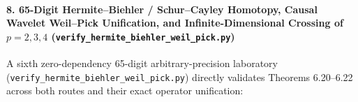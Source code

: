 \documentclass[
  11pt,
]{article}
\begin{document}
\paragraph{\texorpdfstring{8. 65-Digit Hermite--Biehler / Schur--Cayley
Homotopy, Causal Wavelet Weil--Pick Unification, and
Infinite-Dimensional Crossing of \(p = 2, 3, 4\)
(\texttt{verify\_hermite\_biehler\_weil\_pick.py})}{8. 65-Digit Hermite--Biehler / Schur--Cayley Homotopy, Causal Wavelet Weil--Pick Unification, and Infinite-Dimensional Crossing of p = 2, 3, 4 (verify\_hermite\_biehler\_weil\_pick.py)}}\label{digit-hermitebiehler-schurcayley-homotopy-causal-wavelet-weilpick-unification-and-infinite-dimensional-crossing-of-p-2-3-4-verify_hermite_biehler_weil_pick.py}

A sixth zero-dependency 65-digit arbitrary-precision laboratory
(\texttt{verify\_hermite\_biehler\_weil\_pick.py}) directly validates
Theorems 6.20--6.22 across both routes and their exact operator
unification:
\end{document}
